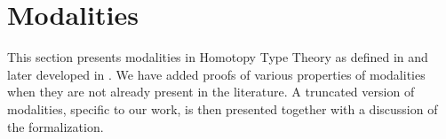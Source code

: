 \documentclass[notfinal]{jfrarticle}
\makeatletter
\def\dar[#1]#2{\ar@<-#2>[#1]\ar@<#2>[#1]} %
\def\tar[#1]#2{\ar@<#2>[#1]\ar@<0pt>[#1]\ar@<-#2>[#1]} %
\makeatother
\begin{document}






\section{Modalities}
\label{sec:modalities}

This section presents modalities in Homotopy Type Theory as defined in
\cite{hottbook} and later developed in
\cite{EPTCS158.8,shulman2015Brouwer}. We have added proofs of various
properties of modalities when they are not already present in the
literature.
A truncated version of modalities, specific to our work, is then
presented together with a discussion of the formalization.  
\end{document}
